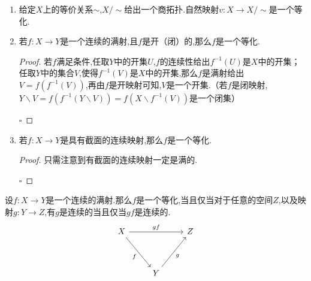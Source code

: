 \documentclass[../../几何与拓扑.tex]{subfiles}
\begin{document}
\begin{example}
    \begin{enumerate}
        \item 给定$X$上的等价关系$\sim$,$X / \sim$给出一个商拓扑.自然映射$v:X\to X/\sim$是一个等化.
        \item 若$f:X\to Y$是一个连续的满射,且$f$是开（闭）的,那么$f$是一个等化.
        \begin{proof}
            若$f$满足条件,任取$Y$中的开集$U$,$f$的连续性给出$f^{-1}\left( U \right)$是$X$中的开集；任取$Y$中的集合$V$,使得$f^{-1}\left( V \right)$是$X$中的开集,那么$f$是满射给出$V=f\left( f^{-1}\left( V \right) \right)$,再由$f$是开映射可知,$V$是一个开集.（若$f$是闭映射,$Y\backslash V=f\left( f^{-1}\left( Y \backslash V \right) \right)=f\left( X \backslash f^{-1}\left( V \right) \right)$是一个闭集）

        
            \hfill $\square$
        \end{proof}
        \item  若$f:X\to Y$是具有截面的连续映射,那么$f$是一个等化.
        \begin{proof}
            只需注意到有截面的连续映射一定是满的.
        
            \hfill $\square$
        \end{proof}
    \end{enumerate}
    
\end{example}

\hspace*{\fill} 
\begin{theorem}
    设$f:X\to Y$是一个连续的满射.那么$f$是一个等化,当且仅当对于任意的空间$Z$,以及映射$g:Y\to Z$,有$g$是连续的当且仅当$gf$是连续的.
    \[
        \begin{tikzcd} X && Z \\ \\ & Y \arrow["gf", from=1-1, to=1-3] \arrow["f"', from=1-1, to=3-2] \arrow["g"', from=3-2, to=1-3] \end{tikzcd} 
    \]
\end{theorem}
\end{document}
